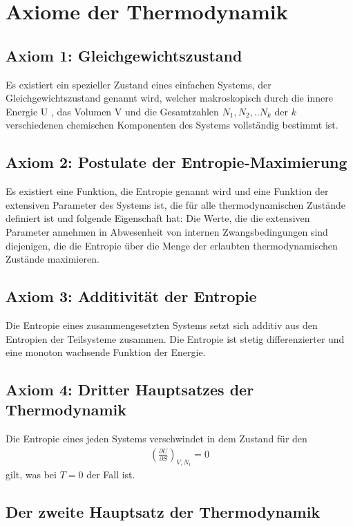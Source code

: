 \section{Axiome der Thermodynamik}

\subsection*{Axiom 1: Gleichgewichtszustand}
Es existiert ein spezieller Zustand eines einfachen Systems, der Gleichgewichtszustand genannt wird, welcher makroskopisch durch die innere Energie U , das Volumen V und die Gesamtzahlen $N_1, N_2, ..N_k$ der $k$ verschiedenen chemischen Komponenten des Systems
vollständig bestimmt ist.

\subsection*{Axiom 2: Postulate der Entropie-Maximierung}
Es existiert eine Funktion, die Entropie genannt wird und eine Funktion der extensiven Parameter des Systems ist, die für alle thermodynamischen Zustände definiert ist und folgende Eigenschaft hat: Die Werte, die die extensiven Parameter annehmen in Abwesenheit von internen Zwangsbedingungen sind diejenigen, die die Entropie über die Menge der erlaubten thermodynamischen Zustände maximieren.

\subsection*{Axiom 3: Additivität der Entropie}
Die Entropie eines zusammengesetzten Systems setzt sich additiv aus den Entropien der Teilsysteme zusammen. Die Entropie ist stetig differenzierter und eine monoton wachsende Funktion der Energie.

\subsection*{Axiom 4: Dritter Hauptsatzes der Thermodynamik}
Die Entropie eines jeden Systems verschwindet in dem Zustand für den
\begin{align}
    \left( \frac{\partial U}{\partial S}\right)_{V, N_i} = 0 
\end{align}
gilt, was bei $T = 0$ der Fall ist.

\subsection{Der zweite Hauptsatz der Thermodynamik}


